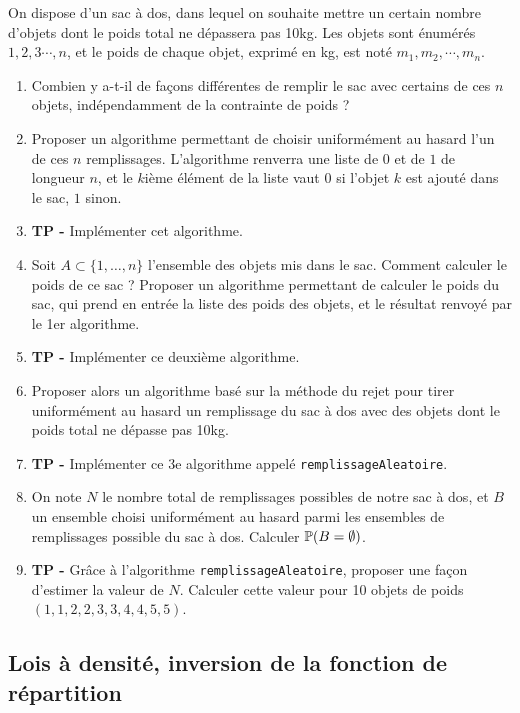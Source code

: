 \documentclass{exercices}
\begin{document}
\begin{exercice}
On dispose d'un sac à dos, dans lequel on souhaite mettre un certain nombre d'objets dont le poids total ne dépassera pas 10kg. Les objets sont énumérés $1, 2, 3 \cdots, n$, et le poids de chaque objet, exprimé en kg, est noté $m_1,m_2,\cdots, m_n$.
\begin{enumerate}
  \item Combien y a-t-il de façons différentes de remplir le sac avec certains de ces $n$ objets, indépendamment de la contrainte de poids ?
  \item Proposer un algorithme permettant de choisir uniformément au hasard l'un de ces $n$ remplissages. L'algorithme renverra une liste de $0$ et de $1$ de longueur $n$, et le $k$ième élément de la liste vaut $0$ si l'objet $k$ est ajouté dans le sac, $1$ sinon.
  \item \textbf{TP -} Implémenter cet algorithme.
  \item Soit $A \subset \{1,\ldots,n\}$ l'ensemble des objets mis dans le sac. Comment calculer le poids de ce sac ? Proposer un algorithme permettant de calculer le poids du sac, qui prend en entrée la liste des poids des objets, et le résultat renvoyé par le 1er algorithme.
  \item \textbf{TP -} Implémenter ce deuxième algorithme.
  \item Proposer alors un algorithme basé sur la méthode du rejet pour tirer uniformément au hasard un remplissage du sac à dos avec des objets dont le poids total ne dépasse pas 10kg.
  \item \textbf{TP -} Implémenter ce 3e algorithme appelé \texttt{remplissageAleatoire}.
  \item On note $N$ le nombre total de remplissages possibles de notre sac à dos, et $B$ un ensemble choisi uniformément au hasard parmi les ensembles de remplissages possible du sac à dos. Calculer $\P(B = \emptyset)$.
  \item \textbf{TP -} Grâce à l'algorithme \texttt{remplissageAleatoire}, proposer une façon d'estimer la valeur de $N$. Calculer cette valeur pour 10 objets de poids $(1,1,2,2,3,3,4,4,5,5)$.
\end{enumerate}

\end{exercice}

\subsection*{Lois à densité, inversion de la fonction de répartition}
\end{document}
